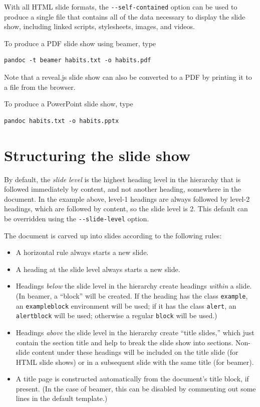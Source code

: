\documentclass[
  b5paper
]{book}
\begin{document}
With all HTML slide formats, the \texttt{-\/-self-contained} option can
be used to produce a single file that contains all of the data necessary
to display the slide show, including linked scripts, stylesheets,
images, and videos.

To produce a PDF slide show using beamer, type

\begin{verbatim}
pandoc -t beamer habits.txt -o habits.pdf
\end{verbatim}

Note that a reveal.js slide show can also be converted to a PDF by
printing it to a file from the browser.

To produce a PowerPoint slide show, type

\begin{verbatim}
pandoc habits.txt -o habits.pptx
\end{verbatim}

\section{Structuring the slide show}\label{structuring-the-slide-show}

By default, the \emph{slide level} is the highest heading level in the
hierarchy that is followed immediately by content, and not another
heading, somewhere in the document. In the example above, level-1
headings are always followed by level-2 headings, which are followed by
content, so the slide level is 2. This default can be overridden using
the \texttt{-\/-slide-level} option.

The document is carved up into slides according to the following rules:

\begin{itemize}
\item
  A horizontal rule always starts a new slide.
\item
  A heading at the slide level always starts a new slide.
\item
  Headings \emph{below} the slide level in the hierarchy create headings
  \emph{within} a slide. (In beamer, a ``block'' will be created. If the
  heading has the class \texttt{example}, an \texttt{exampleblock}
  environment will be used; if it has the class \texttt{alert}, an
  \texttt{alertblock} will be used; otherwise a regular \texttt{block}
  will be used.)
\item
  Headings \emph{above} the slide level in the hierarchy create ``title
  slides,'' which just contain the section title and help to break the
  slide show into sections. Non-slide content under these headings will
  be included on the title slide (for HTML slide shows) or in a
  subsequent slide with the same title (for beamer).
\item
  A title page is constructed automatically from the document's title
  block, if present. (In the case of beamer, this can be disabled by
  commenting out some lines in the default template.)
\end{itemize}
\end{document}
